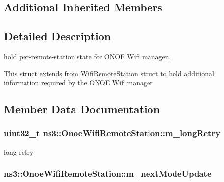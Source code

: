 \subsection*{Additional Inherited Members}


\subsection{Detailed Description}
hold per-\/remote-\/station state for O\+N\+OE Wifi manager. 

This struct extends from \hyperlink{structns3_1_1WifiRemoteStation}{Wifi\+Remote\+Station} struct to hold additional information required by the O\+N\+OE Wifi manager 

\subsection{Member Data Documentation}
\subsubsection[{\texorpdfstring{m\+\_\+long\+Retry}{m_longRetry}}]{\setlength{\rightskip}{0pt plus 5cm}uint32\+\_\+t ns3\+::\+Onoe\+Wifi\+Remote\+Station\+::m\+\_\+long\+Retry}\hypertarget{structns3_1_1OnoeWifiRemoteStation_aa6b67257bd42a91946e51ba30540c4ff}{}\label{structns3_1_1OnoeWifiRemoteStation_aa6b67257bd42a91946e51ba30540c4ff}


long retry 

\subsubsection[{\texorpdfstring{m\+\_\+next\+Mode\+Update}{m_nextModeUpdate}}]{ ns3\+::\+Onoe\+Wifi\+Remote\+Station\+::m\+\_\+next\+Mode\+Update}\hypertarget{structns3_1_1OnoeWifiRemoteStation_a99604194d0e8f479bb63ea0835778cdd}{}\label{structns3_1_1OnoeWifiRemoteStation_a99604194d0e8f479bb63ea0835778cdd}


